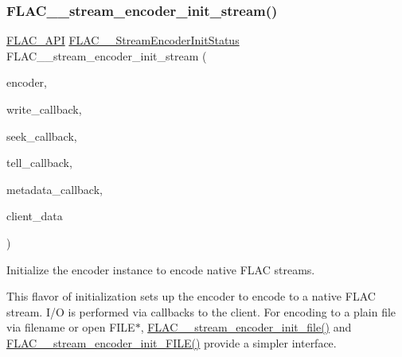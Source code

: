 \subsubsection{\texorpdfstring{FLAC\_\_stream\_encoder\_init\_stream()}{FLAC\_\_stream\_encoder\_init\_stream()}}
{\footnotesize\ttfamily \mbox{\hyperlink{group__flac__export_ga56ca07df8a23310707732b1c0007d6f5}{F\+L\+A\+C\+\_\+\+A\+PI}} \mbox{\hyperlink{group__flac__stream__encoder_ga3bb869620af2b188d77982a5c30b047d}{F\+L\+A\+C\+\_\+\+\_\+\+Stream\+Encoder\+Init\+Status}} F\+L\+A\+C\+\_\+\+\_\+stream\+\_\+encoder\+\_\+init\+\_\+stream (\begin{DoxyParamCaption}\item[{\mbox{\hyperlink{struct_f_l_a_c_____stream_encoder}{F\+L\+A\+C\+\_\+\+\_\+\+Stream\+Encoder}} $\ast$}]{encoder,  }\item[{\mbox{\hyperlink{group__flac__stream__encoder_ga50865125fd57c40fab6eb2f062651429}{F\+L\+A\+C\+\_\+\+\_\+\+Stream\+Encoder\+Write\+Callback}}}]{write\+\_\+callback,  }\item[{\mbox{\hyperlink{group__flac__stream__encoder_ga70b85349d5242e4401c4d8ddf6d9bbca}{F\+L\+A\+C\+\_\+\+\_\+\+Stream\+Encoder\+Seek\+Callback}}}]{seek\+\_\+callback,  }\item[{\mbox{\hyperlink{group__flac__stream__encoder_gabefdf2279e1d0347d9f98f46da4e415b}{F\+L\+A\+C\+\_\+\+\_\+\+Stream\+Encoder\+Tell\+Callback}}}]{tell\+\_\+callback,  }\item[{\mbox{\hyperlink{group__flac__stream__encoder_ga091fbf3340d85bcbda1090c31bc320cf}{F\+L\+A\+C\+\_\+\+\_\+\+Stream\+Encoder\+Metadata\+Callback}}}]{metadata\+\_\+callback,  }\item[{\mbox{\hyperlink{_s_d_l__opengles2__gl2ext_8h_ae5d8fa23ad07c48bb609509eae494c95}{void}} $\ast$}]{client\+\_\+data }\end{DoxyParamCaption})}

Initialize the encoder instance to encode native F\+L\+AC streams.

This flavor of initialization sets up the encoder to encode to a native F\+L\+AC stream. I/O is performed via callbacks to the client. For encoding to a plain file via filename or open {\ttfamily F\+I\+L\+E$\ast$}, \mbox{\hyperlink{group__flac__stream__encoder_ga693bb5ed30d912822e0e6c7c0404428c}{F\+L\+A\+C\+\_\+\+\_\+stream\+\_\+encoder\+\_\+init\+\_\+file()}} and \mbox{\hyperlink{group__flac__stream__encoder_ga78653fea5d9bc490fff34e3ef86de944}{F\+L\+A\+C\+\_\+\+\_\+stream\+\_\+encoder\+\_\+init\+\_\+\+F\+I\+L\+E()}} provide a simpler interface.

